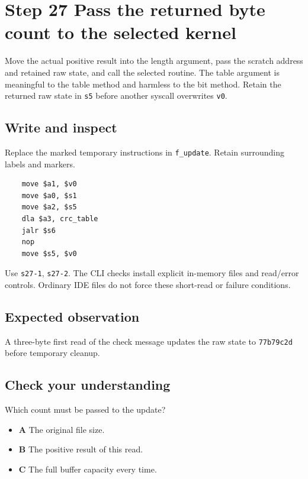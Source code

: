 \section{Step 27 Pass the returned byte count to the selected kernel}\label{crc-s27}

Move the actual positive result into the length argument, pass the scratch address and retained raw state, and call the selected routine. The table argument is meaningful to the table method and harmless to the bit method. Retain the returned raw state in \texttt{s5} before another syscall overwrites \texttt{v0}.

\subsection{Write and inspect}
Replace the marked temporary instructions in \texttt{f\_update}. Retain surrounding labels and markers.

\begin{verbatim}
    move $a1, $v0
    move $a0, $s1
    move $a2, $s5
    dla $a3, crc_table
    jalr $s6
    nop
    move $s5, $v0
\end{verbatim}

Use \texttt{s27-1}, \texttt{s27-2}. The CLI checks install explicit in-memory files and read/error controls. Ordinary IDE files do not force these short-read or failure conditions.

\subsection{Expected observation}
A three-byte first read of the check message updates the raw state to \texttt{77b79c2d} before temporary cleanup.

\subsection{Check your understanding}
Which count must be passed to the update?

\begin{itemize}
  \item \textbf{A} The original file size.
  \item \textbf{B} The positive result of this read.
  \item \textbf{C} The full buffer capacity every time.
\end{itemize}
